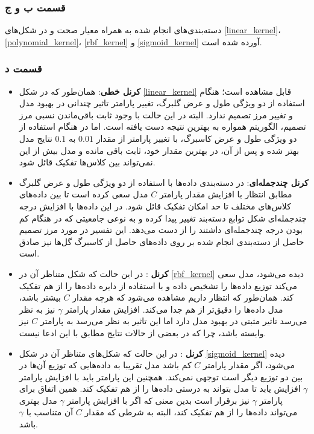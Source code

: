 \documentclass{article}
\begin{document}
\subsubsection*{قسمت ب و ج}

دسته‌بندی‌های انجام شده به همراه معیار صحت و  در شکل‌های \ref{linear_kernel}، \ref{polynomial_kernel}،
\ref{rbf_kernel} و \ref{sigmoid_kernel} آورده شده است.

\subsubsection*{قسمت د}

\begin{itemize}
    \item \textbf{کرنل خطی}: همان‌طور که در شکل \ref{linear_kernel} قابل مشاهده است؛ هنگام استفاده از دو ویژگی
    طول و عرض گلبرگ، تغییر پارامتر  تاثیر چندانی در بهبود مدل و تغییر مرز تصمیم ندارد. البته در این حالت با وجود ثابت باقی‌ماندن
    نسبی مرز تصمیم، الگوریتم همواره به بهترین نتیجه دست یافته است.
    اما در هنگام استفاده از دو ویژگی طول و عرض کاسبرگ، با تغییر پارامتر  از مقدار
    $0.01$ به $0.1$ نتایج مدل بهتر شده و پس از آن، در بهترین مقدار خود، ثابت باقی مانده و مدل بیش از این نمی‌تواند بین کلاس‌ها
    تفکیک قائل شود.
    \item \textbf{کرنل چندجمله‌ای}: در دسته‌بندی داده‌ها با استفاده از دو ویژگی طول و عرض گلبرگ مطابق انتظار
    با افزایش مقدار پارامتر $C$ مدل سعی کرده است تا بین داده‌های کلاس‌های مختلف تا حد امکان تفکیک قائل شود.
    در این داده‌ها با افزایش درجه چندجمله‌ای شکل توابع دسته‌بند تغییر پیدا کرده و به نوعی جامعیتی که در هنگام کم بودن
    درجه چندجمله‌ای داشتند را از دست می‌دهد.
    این تفسیر در مورد مرز تصمیم حاصل از دسته‌بندی انجام شده بر روی داده‌های حاصل از کاسبرگ گل‌ها نیز صادق است.
    \item \textbf{کرنل }: در این حالت که شکل متناظر آن در \ref{rbf_kernel} دیده می‌شود، مدل سعی می‌کند توزیع
    داده‌ها را تشخیص داده و با استفاده از دایره داده‌ها را از هم تفکیک کند. همان‌طور که انتظار داریم مشاهده می‌شود که هرچه مقدار $C$
    بیشتر باشد، مدل داده‌ها را دقیق‌تر از هم جدا می‌کند. افزایش مقدار پارامتر $\gamma$ نیز به نظر می‌رسد
    تاثیر مثبتی در بهبود مدل دارد اما این تاثیر به نظر می‌رسد به پارامتر $C$ نیز وابسته باشد، چرا که در بعضی از حالات
    نتایج مطابق با این ادعا نیست.
    \item \textbf{کرنل }: در این حالت که شکل‌های متناظر آن در شکل \ref{sigmoid_kernel} دیده می‌شود،
    اگر مقدار پارامتر $C$ کم باشد مدل تقریبا به داده‌هایی که توزیع آن‌ها در بین دو توزیع دیگر است توجهی نمی‌کند.
    همچنین این پارامتر باید با افزایش پارامتر $\gamma$ افزایش یابد تا مدل بتواند به درستی داده‌ها را از هم تفکیک کند.
    همین اتفاق برای پارامتر $\gamma$ نیز برقرار است بدین معنی که اگر با افزایش پارامتر $\gamma$ مدل بهتری می‌تواند داده‌ها
    را از هم تفکیک کند، البته به شرطی که مقدار $C$ آن متناسب با $\gamma$ باشد.
\end{itemize}
\end{document}
